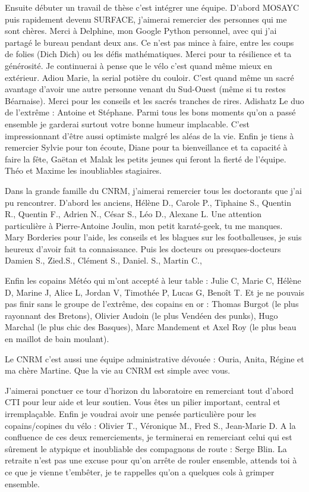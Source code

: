 Ensuite débuter un travail de thèse c’est intégrer une équipe. D’abord MOSAYC puis rapidement devenu SURFACE, j’aimerai remercier des personnes qui me sont chères. 
Merci à Delphine, mon Google Python personnel, avec qui j'ai partagé le bureau pendant deux ans. Ce n’est pas mince à faire, entre les coups de folies (Dich Dich) ou les défis mathématiques. Merci pour ta résilience et ta générosité. Je continuerai à pense que le vélo c’est quand même mieux en extérieur. 
Adiou Marie, la serial potière du couloir. C’est quand même un sacré avantage d’avoir une autre personne venant du Sud-Ouest (même si tu restes Béarnaise). Merci pour les conseils et les sacrés tranches de rires. Adishatz
Le duo de l’extrême : Antoine et Stéphane. Parmi tous les bons moments qu’on a passé ensemble je garderai surtout votre bonne humeur implacable. C’est impressionnant d’être aussi optimiste malgré les aléas de la vie.
Enfin je tiens à remercier Sylvie pour ton écoute, Diane pour ta bienveillance et ta capacité à faire la fête, Gaëtan et Malak les petits jeunes qui feront la fierté de l’équipe. Théo et Maxime les inoubliables stagiaires.

Dans la grande famille du CNRM, j’aimerai remercier tous les doctorants que j’ai pu rencontrer. D’abord les anciens, Hélène D., Carole P., Tiphaine S., Quentin R., Quentin F., Adrien N., César S., Léo D., Alexane L.
Une attention particulière à Pierre-Antoine Joulin, mon petit karaté-geek, tu me manques. Mary Borderies pour l’aide, les conseils et les blagues sur les footballeuses, je suis heureux d’avoir fait ta connaissance.
Puis les docteurs ou presques-docteurs Damien S., Zied.S., Clément S., Daniel. S., Martin C., 

Enfin les copains Météo qui m’ont accepté à leur table : Julie C, Marie C, Hélène D, Marine J, Alice L, Jordan V, Timothée P, Lucas G, Benoît T. Et je ne pouvais pas finir sans le groupe de l’extrême, des copains en or : Thomas Burgot (le plus rayonnant des Bretons), Olivier Audoin (le plus Vendéen des punks), Hugo Marchal (le plus chic des Basques), Marc Mandement et Axel Roy (le plus beau en maillot de bain moulant).

Le CNRM c’est aussi une équipe administrative dévouée : Ouria, Anita, Régine et ma chère Martine. Que la vie au CNRM est simple avec vous. 

J’aimerai ponctuer ce tour d’horizon du laboratoire en remerciant tout d’abord CTI pour leur aide et leur soutien. Vous êtes un pilier important, central et irremplaçable. Enfin je voudrai avoir une pensée particulière pour les copains/copines du vélo : Olivier T., Véronique M., Fred S., Jean-Marie D.
A la confluence de ces deux remerciements, je terminerai en remerciant celui qui est sûrement le  atypique et inoubliable des compagnons de route : Serge Blin. La retraite n’est pas une excuse pour qu’on arrête de rouler ensemble, attends toi à ce que je vienne t’embêter, je te rappelles qu’on a quelques cols à grimper ensemble.

